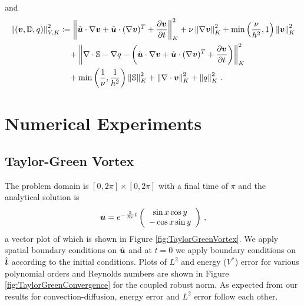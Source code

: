 \documentclass[Dissertation.tex]{subbIles}
\begin{document}
and
\begin{align*}
\left\| \left( \boldsymbol v,\mathbb{D},q \right) \right\|_{V,K}^2 &\coloneqq
\left\| \tilde{\boldsymbol u}\cdot\nabla\boldsymbol v +\tilde{\boldsymbol u}\cdot(\nabla\boldsymbol v)^T+\frac{\partial\boldsymbol v}{\partial t} \right\|_K^2
+ \nu\left\| \nabla\boldsymbol v \right\|_K^2
+ \min\left( \frac{\nu}{h^2},1 \right)\left\| \boldsymbol v \right\|^2_K
\\\nonumber&\quad
+ \left\| \nabla\cdot\mathbb{S}-\nabla q-\left( \tilde{\boldsymbol u}\cdot\nabla\boldsymbol v +\tilde{\boldsymbol u}\cdot(\nabla\boldsymbol v)^T+\frac{\partial\boldsymbol v}{\partial t} \right) \right\|_K^2
\\\nonumber&\quad
+ \min\left( \frac{1}{\nu},\frac{1}{h^2} \right)\left\| \mathbb{S} \right\|_K^2
+\left\| \nabla\cdot\boldsymbol v \right\|_K^2
+\left\| q \right\|_K^2
\,.
\end{align*}

\section{Numerical Experiments}
\subsection{Taylor-Green Vortex}
The problem domain is $[0,2\pi]\times[0,2\pi]$ with a final time of $\pi$ and the analytical solution is 
\[
\boldsymbol u=e^{-\frac{2}{Re}t}\left( \begin{array}{c} \sin{x}\cos{y}\\ -\cos{x}\sin{y}\\ \end{array} \right)\,,
\]
a vector plot of which is shown in Figure \ref{fig:TaylorGreenVortex}.
We apply spatial boundary conditions on $\hat{\boldsymbol u}$ and at $t=0$ we apply boundary conditions
on $\hat{\boldsymbol t}$ according to the initial conditions.
Plots of $L^2$ and energy ($V^*$) error for various polynomial orders and Reynolds numbers are shown
in Figure \ref{fig:TaylorGreenConvergence} for the coupled robust norm.
As expected from our results for convection-diffusion, energy error and $L^2$ error follow each other.
\end{document}
